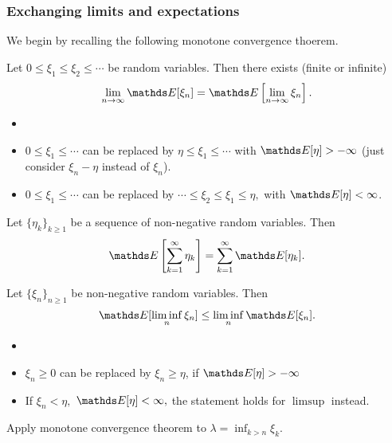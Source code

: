 \subsubsection{Exchanging limits and expectations}
We begin by recalling the following monotone convergence thoerem.
\begin{theorem}
Let $0 \le \xi_1 \le \xi_2 \le \cdots $ be random variables. Then there exists (finite or infinite)
\begin{equation}
    \lim_{n \rightarrow \infty} \E[\xi_n] = \E \sqbracket{\lim_{n \rightarrow \infty} \xi_n}.
\end{equation}
\end{theorem}

\begin{remark}
\begin{itemize}
    \item[]
    \item $0 \le \xi_1 \le \cdots$ can be replaced by $\eta \le \xi_1 \le \cdots$ with $\E[\eta] > -\infty$ (just consider $\xi_n - \eta$ instead of $\xi_n$).
    \item $0 \le \xi_1 \le \cdots$ can be replaced by $\cdots \le \xi_2 \le \xi_1 \le \eta,$ with $\E[\eta] < \infty$.
\end{itemize}
\end{remark}

\begin{corollary}
Let $\{\eta_k\}_{k\ge1}$ be a sequence of non-negative random variables. Then 
\begin{equation}
    \E \sqbracket{\sum_{k=1}^\infty \eta_k} = \sum_{k=1}^\infty \E [\eta_k].
\end{equation}

\end{corollary}
\begin{theorem}
Let $\{\xi_n\}_{n\ge 1}$ be non-negative random variables. Then
\begin{equation}
    \E [\liminf_n \xi_n] \le \liminf_n \E [\xi_n].
\end{equation}
\end{theorem}
\begin{remark}
\begin{itemize}
    \item[]
    \item $\xi_n \ge 0$ can be replaced by $\xi_n \ge \eta$, if $\E [\eta] > -\infty$
    \item If $\xi_n < \eta,$ $\E [\eta] < \infty,$ the statement holds for $\limsup$ instead.
\end{itemize}
\end{remark}
\begin{hint}
Apply monotone convergence theorem to $\lambda = \inf_{k>n} \xi_k$.
\end{hint}

